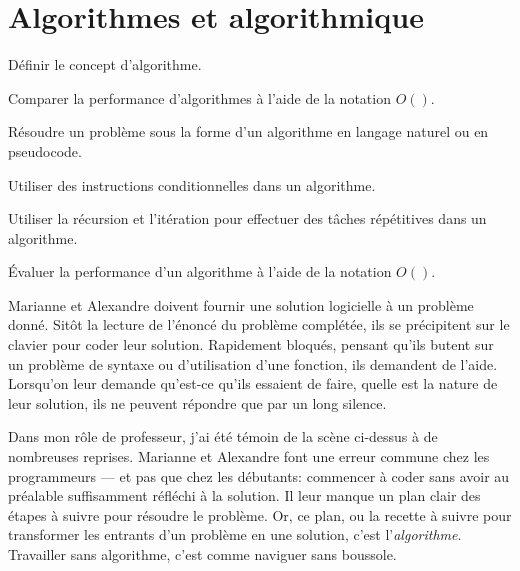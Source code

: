 
\chapter{Algorithmes et algorithmique}
\label{chap:algorithmes}

\def\scriptfilename{\currfilebase.R}

\begin{objectifs}
  \item Définir le concept d'algorithme.
\item Comparer la performance d'algorithmes à l'aide de la notation
  $O()$.

\item Résoudre un problème sous la forme d'un algorithme en langage
  naturel ou en pseudocode.
\item Utiliser des instructions conditionnelles dans un algorithme.
\item Utiliser la récursion et l'itération pour effectuer des tâches
  répétitives dans un algorithme.
\item Évaluer la performance d'un algorithme à l'aide de la notation
  $O()$.
\end{objectifs}

Marianne et Alexandre doivent fournir une solution logicielle à un
problème donné. Sitôt la lecture de l'énoncé du problème complétée,
ils se précipitent sur le clavier pour coder leur solution. Rapidement
bloqués, pensant qu'ils butent sur un problème de syntaxe ou
d'utilisation d'une fonction, ils demandent de l'aide. Lorsqu'on leur
demande qu'est-ce qu'ils essaient de faire, quelle est la nature de leur
solution, ils ne peuvent répondre que par un long silence.

Dans mon rôle de professeur, j'ai été témoin de la scène ci-dessus à
de nombreuses reprises. Marianne et Alexandre font une erreur commune
chez les programmeurs --- et pas que chez les débutants: commencer à
coder sans avoir au préalable suffisamment réfléchi à la solution. Il
leur manque un plan clair des étapes à suivre pour résoudre le
problème. Or, ce plan, ou la recette à suivre pour transformer les
entrants d'un problème en une solution, c'est
l'\emph{algorithme}. Travailler sans algorithme,
c'est comme naviguer sans boussole.

